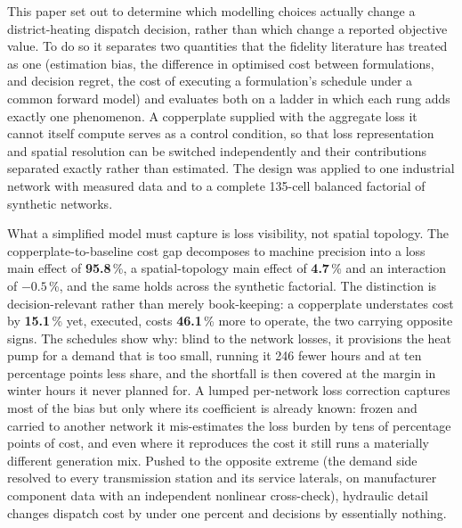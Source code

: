 
This paper set out to determine which modelling choices actually change a district-heating
dispatch decision, rather than which change a reported objective value. To do so it
separates two quantities that the fidelity literature has treated as one (estimation
bias, the difference in optimised cost between formulations, and decision regret, the cost
of executing a formulation's schedule under a common forward model) and evaluates both on
a ladder in which each rung adds exactly one phenomenon. A copperplate supplied with the
aggregate loss it cannot itself compute serves as a control condition, so that loss
representation and spatial resolution can be switched independently and their contributions
separated exactly rather than estimated. The design was applied to one industrial network
with measured data and to a complete 135-cell balanced factorial of synthetic networks.

What a simplified model must capture is loss visibility, not spatial topology. The
copperplate-to-baseline cost gap decomposes to machine precision into a loss main effect of
\textbf{95.8}\,\%, a spatial-topology main effect of \textbf{4.7}\,\% and an interaction of
\textbf{$-0.5$}\,\%, and the same holds across the synthetic factorial. The distinction is
decision-relevant rather than merely book-keeping: a copperplate understates cost by
\textbf{15.1}\,\% yet, executed, costs \textbf{46.1}\,\% more to operate, the two carrying
opposite signs. The schedules show why: blind to the network losses, it provisions the heat pump
for a demand that is too small, running it 246 fewer hours and at ten percentage points less
share, and the shortfall is then covered at the margin in winter hours it never planned for. A lumped
per-network loss correction captures most of the bias but only where its coefficient is
already known: frozen and carried to another network it mis-estimates the loss burden by
tens of percentage points of cost, and even where it reproduces the cost it still runs a
materially different generation mix. Pushed to the opposite extreme (the demand side
resolved to every transmission station and its service laterals, on manufacturer component
data with an independent nonlinear cross-check), hydraulic detail changes dispatch cost by
under one percent and decisions by essentially nothing.


